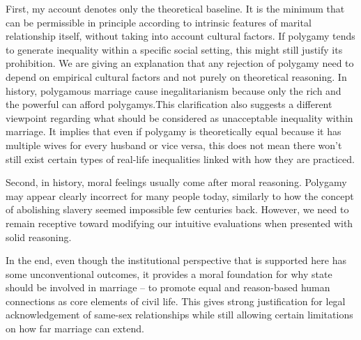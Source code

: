 \documentclass[man,floatsintext]{apa7}
\begin{document}
First, my account denotes only the theoretical baseline. It is the minimum that can be permissible in principle according to intrinsic features of marital relationship itself, without taking into account cultural factors. If polygamy tends to generate inequality within a specific social setting, this might still justify its prohibition. We are giving an explanation that any rejection of polygamy need to depend on empirical cultural factors and not purely on theoretical reasoning. In history, polygamous marriage cause inegalitarianism because only the rich and the powerful can afford polygamys.This clarification also suggests a different viewpoint regarding what should be considered as unacceptable inequality within marriage. It implies that even if polygamy is theoretically equal because it has multiple wives for every husband or vice versa, this does not mean there won't still exist certain types of real-life inequalities linked with how they are practiced.

Second, in history, moral feelings usually come after moral reasoning. Polygamy may appear clearly incorrect for many people today, similarly to how the concept of abolishing slavery seemed impossible few centuries back. However, we need to remain receptive toward modifying our intuitive evaluations when presented with solid reasoning.

In the end, even though the institutional perspective that is supported here has some unconventional outcomes, it provides a moral foundation for why state should be involved in marriage -- to promote equal and reason-based human connections as core elements of civil life. This gives strong justification for legal acknowledgement of same-sex relationships while still allowing certain limitations on how far marriage can extend.


\printbibliography{}
\end{document}
